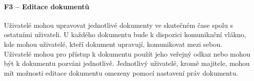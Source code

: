 \paragraph{F3 -- Editace dokumentů}

Uživatelé mohou upravovat jednotlivé dokumenty ve skutečném čase spolu s ostatními uživateli.
U každého dokumentu bude k dispozici komunikační vlákno, kde mohou uživatelé, kteří dokument upravují, komunikovat mezi sebou.
Uživatelé mohou pro přístup k dokumentu použít jeho veřejný odkaz nebo mohou být k dokumentu pozváni jednotlivě.
Jednotlivý uživatelé, kromě majitele, mohou mít možnosti editace dokumentu omezeny pomocí nastavení práv dokumentu.
